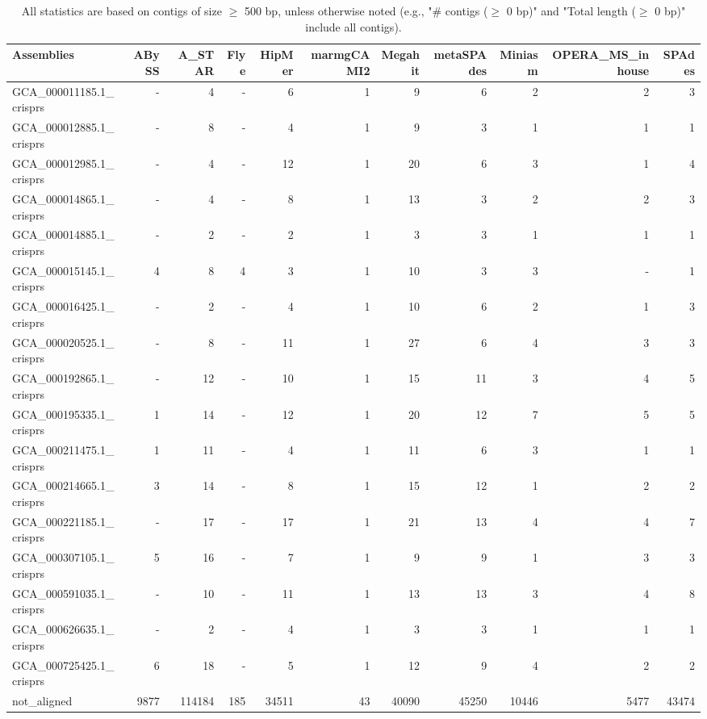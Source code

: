 \documentclass[12pt,a4paper]{article}
\begin{document}
\begin{table}[ht]
\begin{center}
\caption{All statistics are based on contigs of size $\geq$ 500 bp, unless otherwise noted (e.g., "\# contigs ($\geq$ 0 bp)" and "Total length ($\geq$ 0 bp)" include all contigs).}
\begin{tabular}{|l*{10}{|r}|}
\hline
Assemblies & ABySS & A\_STAR & Flye & HipMer & marmgCAMI2 & Megahit & metaSPAdes & Miniasm & OPERA\_MS\_inhouse & SPAdes \\ \hline
GCA\_000011185.1\_crisprs & - & 4 & - & 6 & 1 & 9 & 6 & 2 & 2 & 3 \\ \hline
GCA\_000012885.1\_crisprs & - & 8 & - & 4 & 1 & 9 & 3 & 1 & 1 & 1 \\ \hline
GCA\_000012985.1\_crisprs & - & 4 & - & 12 & 1 & 20 & 6 & 3 & 1 & 4 \\ \hline
GCA\_000014865.1\_crisprs & - & 4 & - & 8 & 1 & 13 & 3 & 2 & 2 & 3 \\ \hline
GCA\_000014885.1\_crisprs & - & 2 & - & 2 & 1 & 3 & 3 & 1 & 1 & 1 \\ \hline
GCA\_000015145.1\_crisprs & 4 & 8 & 4 & 3 & 1 & 10 & 3 & 3 & - & 1 \\ \hline
GCA\_000016425.1\_crisprs & - & 2 & - & 4 & 1 & 10 & 6 & 2 & 1 & 3 \\ \hline
GCA\_000020525.1\_crisprs & - & 8 & - & 11 & 1 & 27 & 6 & 4 & 3 & 3 \\ \hline
GCA\_000192865.1\_crisprs & - & 12 & - & 10 & 1 & 15 & 11 & 3 & 4 & 5 \\ \hline
GCA\_000195335.1\_crisprs & 1 & 14 & - & 12 & 1 & 20 & 12 & 7 & 5 & 5 \\ \hline
GCA\_000211475.1\_crisprs & 1 & 11 & - & 4 & 1 & 11 & 6 & 3 & 1 & 1 \\ \hline
GCA\_000214665.1\_crisprs & 3 & 14 & - & 8 & 1 & 15 & 12 & 1 & 2 & 2 \\ \hline
GCA\_000221185.1\_crisprs & - & 17 & - & 17 & 1 & 21 & 13 & 4 & 4 & 7 \\ \hline
GCA\_000307105.1\_crisprs & 5 & 16 & - & 7 & 1 & 9 & 9 & 1 & 3 & 3 \\ \hline
GCA\_000591035.1\_crisprs & - & 10 & - & 11 & 1 & 13 & 13 & 3 & 4 & 8 \\ \hline
GCA\_000626635.1\_crisprs & - & 2 & - & 4 & 1 & 3 & 3 & 1 & 1 & 1 \\ \hline
GCA\_000725425.1\_crisprs & 6 & 18 & - & 5 & 1 & 12 & 9 & 4 & 2 & 2 \\ \hline
not\_aligned & 9877 & 114184 & 185 & 34511 & 43 & 40090 & 45250 & 10446 & 5477 & 43474 \\ \hline
\end{tabular}
\end{center}
\end{table}
\end{document}
